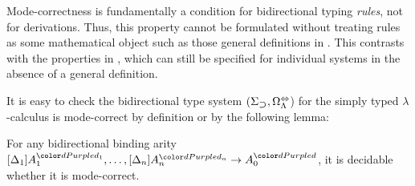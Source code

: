 \begin{remark}
  Mode-correctness is fundamentally a condition for bidirectional typing \emph{rules}, not for derivations.
  Thus, this property cannot be formulated without treating rules as some mathematical object such as those general definitions in .
  This contrasts with the properties in , which can still be specified for individual systems in the absence of a general definition.
\end{remark}

It is easy to check the bidirectional type system $(\Sigma_{\mathbin{\bm{\supset}}}, \Omega^{\Leftrightarrow}_{\Lambda}$) for the simply typed $\lambda$-calculus is mode-correct by definition or by the following lemma:
\begin{lemma}\label{lem:decidability-mode-correctness}
  For any bidirectional binding arity $\biarity$, it is decidable whether it is mode-correct.
\end{lemma}


